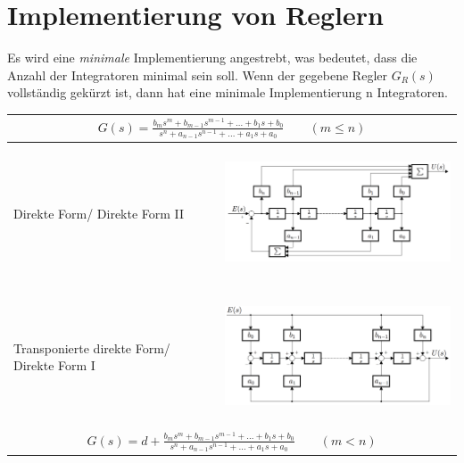 \vspace{-0.5cm}
\section{Implementierung von Reglern }
\vspace{-0.5cm}
Es wird eine \textit{minimale} Implementierung angestrebt, was bedeutet, dass die Anzahl
der Integratoren minimal sein soll. Wenn der gegebene Regler $G_R(s)$ vollständig
gekürzt ist, dann hat eine minimale Implementierung n Integratoren.
\vspace{1cm}
\begin{center}
	\begin{tabu}{|p{0.25\textwidth}|p{0.7\textwidth}|}
	\hline
	\\[2mm]
	\hline
	\vspace*{-0.5cm}Direkte Form/ Direkte Form II
		& \includegraphics[width = \linewidth, height = 4cm, trim = 0 0 0 -5]{./images/DirekteForm2}\vspace*{-0.5cm}\\[2mm]
	\hline
	\vspace*{-0.5cm}Transponierte direkte Form/ Direkte Form I
		& \includegraphics[width = \linewidth, height = 4cm, trim = 0 0 0 -5]{./images/DirekteForm1}\vspace*{-0.5cm}\\[2mm]
	\hline
	\\[2mm]

\end{tabu}
\end{center}
